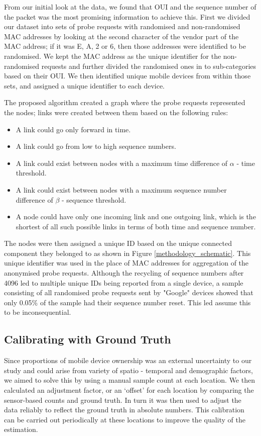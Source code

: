From our initial look at the data, we found that OUI and the sequence number of
the packet was the most promising information to achieve this.  First we divided
our dataset into sets of probe requests with randomised and non-randomised MAC
addresses by looking at the second character of the vendor part of the MAC
address; if it was E, A, 2 or 6, then those addresses were identified to be
randomised. We kept the MAC address as the unique identifier for the
non-randomised requests and further divided the randomised ones in to
sub-categories based on their OUI. We then  identified unique mobile devices
from within those sets, and assigned a unique identifier to each device.

The proposed algorithm created a graph where the probe requests represented the
nodes; links were created between them based on the following rules:

\begin{itemize} 
\item A link could go only forward in time. 
\item A link could go from low to high sequence numbers. 
\item A link could exist between nodes with a maximum time difference of
	$\alpha$ - time threshold. 
\item A link could exist between nodes with a maximum sequence number
	difference of $\beta$ - sequence threshold.
\item A node could have only one incoming link and one outgoing link, which is
	the shortest of all such possible links in terms of both time and sequence
	number.
\end{itemize}

The nodes were then assigned a unique ID based on the unique connected component
they belonged to as shown in Figure \ref{methodology_schematic}. This unique
identifier was used in the place of MAC addresses for aggregation of the
anonymised probe requests. Although the recycling of sequence numbers after 4096
led to multiple unique IDs being reported from a single device, a sample
consisting of all randomised probe requests sent by "Google" devices showed that
only 0.05\% of the sample had their sequence number reset. This led assume this
to be inconsequential. 

\subsection{Calibrating with Ground Truth} 

Since proportions of mobile device ownership was an external uncertainty to our
study and could arise from variety of spatio - temporal and demographic factors,
we aimed to solve this by using a manual sample count at each location. We then
calculated an adjustment factor, or an `offset' for each location by comparing
the sensor-based counts and ground truth. In turn it was then used to adjust the
data reliably to reflect the ground truth in absolute numbers.  This calibration
can be carried out periodically at these locations to improve the quality of the
estimation.
